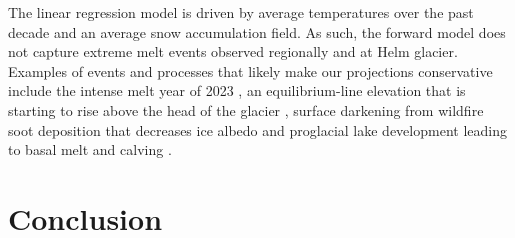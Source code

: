 \documentclass[annals,twocolumn,letterpaper]{igs}
\begin{document}
The linear regression model is driven by average temperatures over the past decade and an average snow accumulation field. As such, the forward model does not capture extreme melt events observed regionally and at Helm glacier. Examples of events and processes that likely make our projections conservative include the intense melt year of 2023 \citep{Menounos2025}, an equilibrium-line elevation that is starting to rise above the head of the glacier \citep{Bevington2025}, surface darkening from wildfire soot deposition that decreases ice albedo \citep{Menounos2025,AubryWake2022} and proglacial lake development leading to basal melt and calving \citep{Carrivick2013,Shugar2020}. 

\section{Conclusion}



\end{document}
